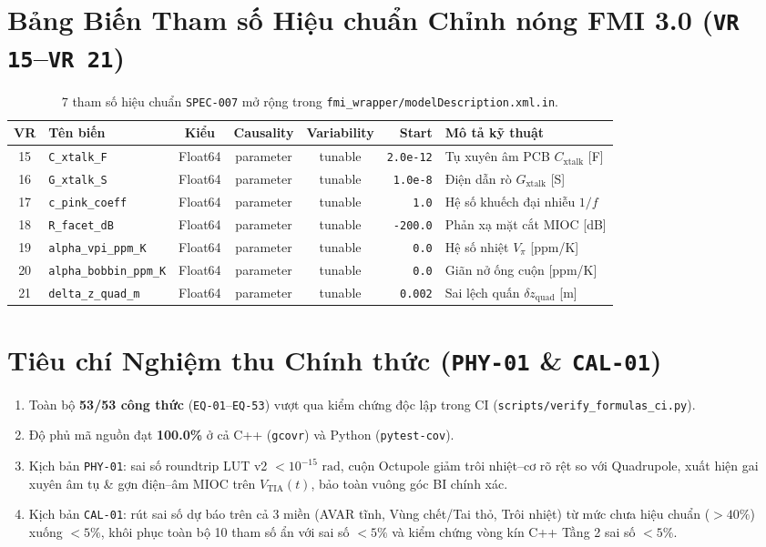 \documentclass[11pt, a4paper]{article}
\begin{document}
\section{Bảng Biến Tham số Hiệu chuẩn Chỉnh nóng FMI 3.0 (\texttt{VR 15}--\texttt{VR 21})}

\begin{table}[htbp]
\centering
\caption{7 tham số hiệu chuẩn \texttt{SPEC-007} mở rộng trong \texttt{fmi\_wrapper/modelDescription.xml.in}.}
\footnotesize
\begin{tabular}{@{}c l c c c r L{4.6cm}@{}}
\toprule
\textbf{VR} & \textbf{Tên biến} & \textbf{Kiểu} & \textbf{Causality} & \textbf{Variability} & \textbf{Start} & \textbf{Mô tả kỹ thuật} \\
 & \texttt{C\_xtalk\_F} & Float64 & parameter & tunable & \texttt{2.0e-12} & Tụ xuyên âm PCB $C_{\text{xtalk}}$ [F] \\
16 & \texttt{G\_xtalk\_S} & Float64 & parameter & tunable & \texttt{1.0e-8} & Điện dẫn rò $G_{\text{xtalk}}$ [S] \\
17 & \texttt{c\_pink\_coeff} & Float64 & parameter & tunable & \texttt{1.0} & Hệ số khuếch đại nhiễu $1/f$ \\
18 & \texttt{R\_facet\_dB} & Float64 & parameter & tunable & \texttt{-200.0} & Phản xạ mặt cắt MIOC [dB] \\
19 & \texttt{alpha\_vpi\_ppm\_K} & Float64 & parameter & tunable & \texttt{0.0} & Hệ số nhiệt $V_\pi$ [ppm/K] \\
20 & \texttt{alpha\_bobbin\_ppm\_K} & Float64 & parameter & tunable & \texttt{0.0} & Giãn nở ống cuộn [ppm/K] \\
21 & \texttt{delta\_z\_quad\_m} & Float64 & parameter & tunable & \texttt{0.002} & Sai lệch quấn $\delta z_{\text{quad}}$ [m] \\
\bottomrule
\end{tabular}
\end{table}

\section{Tiêu chí Nghiệm thu Chính thức (\texttt{PHY-01} \& \texttt{CAL-01})}
\begin{enumerate}
\item Toàn bộ \textbf{53/53 công thức} (\texttt{EQ-01}--\texttt{EQ-53}) vượt qua kiểm chứng độc lập trong CI (\texttt{scripts/verify\_formulas\_ci.py}).
\item Độ phủ mã nguồn đạt \textbf{100.0\%} ở cả C++ (\texttt{gcovr}) và Python (\texttt{pytest-cov}).
\item Kịch bản \texttt{PHY-01}: sai số roundtrip LUT v2 $< 10^{-15}\text{ rad}$, cuộn Octupole giảm trôi nhiệt--cơ rõ rệt so với Quadrupole, xuất hiện gai xuyên âm tụ \& gợn điện--âm MIOC trên $V_{\text{TIA}}(t)$, bảo toàn vuông góc BI chính xác.
\item Kịch bản \texttt{CAL-01}: rút sai số dự báo trên cả 3 miền (AVAR tĩnh, Vùng chết/Tai thỏ, Trôi nhiệt) từ mức chưa hiệu chuẩn ($> 40\%$) xuống \textbf{$< 5\%$}, khôi phục toàn bộ 10 tham số ẩn với sai số $< 5\%$ và kiểm chứng vòng kín C++ Tầng 2 sai số $< 5\%$.
\end{enumerate}
\end{document}
